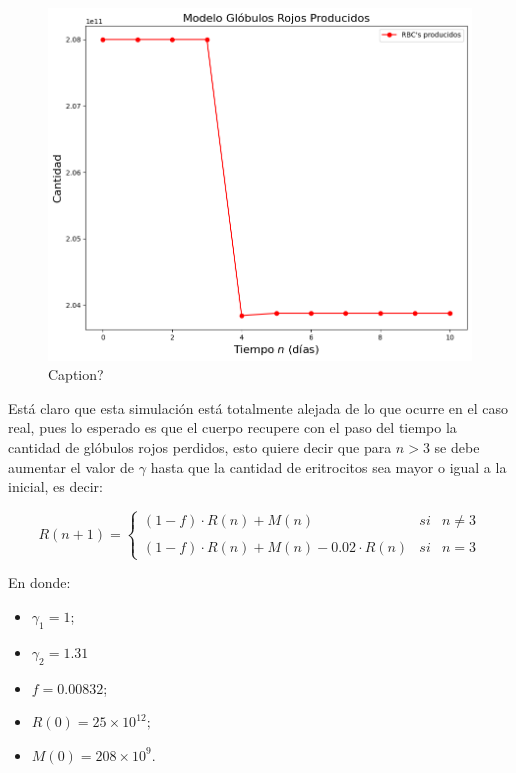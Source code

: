 \begin{figure}[H]
    \centering
    \includegraphics[scale=0.57]{figures/HemoLeveG1SC.png}
    \caption{Caption?}
    \label{sec:variaciones:fig:HemoLeveG1SC}
\end{figure}

Está claro que esta simulación está totalmente alejada de lo que ocurre en el caso real, pues lo esperado es que el cuerpo recupere con el paso del tiempo la cantidad de glóbulos rojos perdidos, esto quiere decir que para $n>3$ se debe aumentar el valor de $\gamma$ hasta que la cantidad de eritrocitos sea mayor o igual a la inicial, es decir:

$$R(n+1)= \left\{ \begin{array}{lcc} (1-f)\cdot R(n)+M(n) & si & n \neq 3 \\ \\ (1-f)\cdot R(n)+M(n)-0.02\cdot R(n) & si & n = 3\end{array} \right.$$

En donde:
\begin{itemize}
    \item $\gamma_1=1$;
    \item $\gamma_2=1.31$
    \item $f=0.00832$;
    \item $R(0) = 25\times 10^{12};$
    \item $M(0) = 208 \times 10^{9}.$
\end{itemize}

